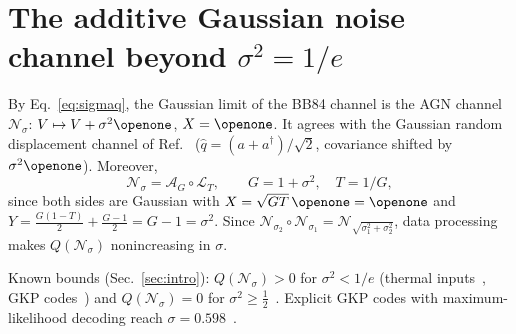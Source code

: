 \documentclass[aps,pra,reprint,superscriptaddress,nofootinbib,longbibliography,floatfix]{revtex4-2}
\theoremstyle{remark}
\newcommand{\one}{\openone}
\newcommand{\Nsig}{\mathcal{N}_\sigma}
\newcommand{\Amp}{\mathcal{A}}
\newcommand{\Loss}{\mathcal{L}}
\begin{document}
\section{The additive Gaussian noise channel beyond $\sigma^2=1/e$}
\label{sec:agn}

By Eq.~\eqref{eq:sigmaq}, the Gaussian limit of the BB84 channel is the AGN channel
$\Nsig$: $V\mapsto V+\sigma^2\one$, $X=\one$. It agrees with the Gaussian random displacement channel of
Ref.~\cite{lin2025gkp} ($\hat q=(a+a^\dagger)/\sqrt2$, covariance shifted by $\sigma^2\one$).
Moreover,
\begin{equation}
  \Nsig=\Amp_G\circ\Loss_T,\qquad G=1+\sigma^2,\quad T=1/G,
  \label{eq:agnTG}
\end{equation}
since both sides are Gaussian with $X=\sqrt{GT}\,\one=\one$ and
$Y=\frac{G(1-T)}2+\frac{G-1}2=G-1=\sigma^2$. Since $\mathcal N_{\sigma_2}\circ\mathcal N_{\sigma_1}=
\mathcal N_{\sqrt{\sigma_1^2+\sigma_2^2}}$, data processing makes $Q(\Nsig)$ nonincreasing in $\sigma$.

Known bounds (Sec.~\ref{sec:intro}): $Q(\Nsig)>0$ for $\sigma^2<1/e$ (thermal
inputs~\cite{holevo2001evaluating}, GKP codes~\cite{harrington2001achievable}) and $Q(\Nsig)=0$ for
$\sigma^2\ge\frac12$~\cite{caruso2006degradability,lami2019extendibility}. Explicit GKP codes with
maximum-likelihood decoding reach $\sigma=0.598$~\cite{lin2025gkp}.
\end{document}
